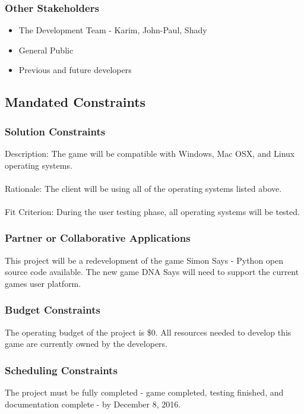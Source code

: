 \documentclass[12pt, titlepage]{article}
\begin{document}
\subsubsection{Other Stakeholders}
\begin{itemize}
\item The Development Team - Karim, John-Paul, Shady
\item General Public
\item Previous and future developers
\end{itemize}

\subsection{Mandated Constraints}

\subsubsection{Solution Constraints}
Description: The game will be compatible with Windows, Mac OSX, and Linux operating systems.\\
\\
Rationale: The client will be using all of the operating systems listed above.\\
\\
Fit Criterion: During the user testing phase, all operating systems will be tested.

\subsubsection{Partner or Collaborative Applications}
This project will be a redevelopment of the game Simon Says - Python open source code available. The new game DNA Says will need to support the current games user platform.

\subsubsection{Budget Constraints}
The operating budget of the project is \$0. All resources needed to develop this game are currently owned by the developers.

\subsubsection{Scheduling Constraints}
The project must be fully completed - game completed, testing finished, and documentation complete - by December 8, 2016.
\end{document}
